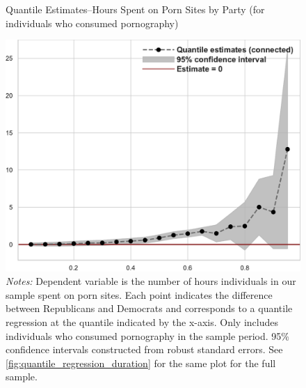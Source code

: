 \documentclass[12pt, letterpaper]{article}
\begin{document}
\begin{figure}[ht]
	\centering
	\caption{Quantile Estimates--Hours Spent on Porn Sites by Party (for individuals who consumed pornography)}
	\includegraphics[width=.55\linewidth]{../figs/quantile_reg_nonzero_duration_adult.pdf}
	\caption*{\footnotesize \emph{Notes:} 
		Dependent variable is the number of hours individuals in our sample spent on porn sites.
		Each point indicates the difference between Republicans and Democrats and corresponds to a quantile regression at the quantile indicated by the x-axis.
		Only includes individuals who consumed pornography in the sample period.
		95\% confidence intervals constructed from robust standard errors.
		See \cref{fig:quantile_regression_duration} for the same plot for the full sample.
	}
	\label{fig:quantile_regression_duration_nonzeroes}
\end{figure}
\end{document}
